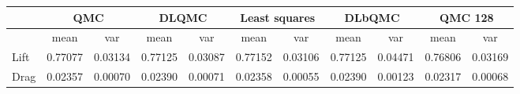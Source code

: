 \begin{tabular}{|l|c|c|c|c|c|c|c|c|c|c|}
\hline
 &\multicolumn{2}{c|}{\textbf{QMC}}&\multicolumn{2}{c|}{\textbf{DLQMC}}&\multicolumn{2}{c|}{\textbf{Least squares}}&\multicolumn{2}{c|}{\textbf{DLbQMC}}&\multicolumn{2}{c|}{\textbf{QMC 128}}\\ 
\hline

 &mean&var&mean&var&mean&var&mean&var&mean&var\\ 
\hline
Lift &0.77077&0.03134&0.77125&0.03087&0.77152&0.03106&0.77125&0.04471&0.76806&0.03169\\ 
\hline
Drag &0.02357&0.00070&0.02390&0.00071&0.02358&0.00055&0.02390&0.00123&0.02317&0.00068\\ 
\hline
\end{tabular}

